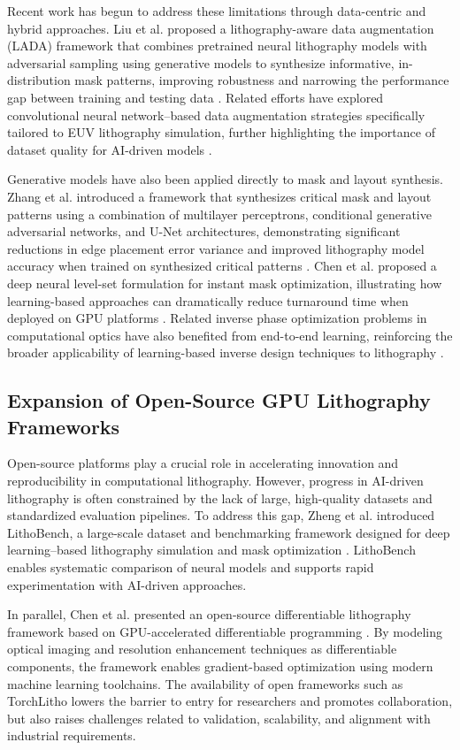 \documentclass[pdflatex,sn-mathphys-num]{sn-jnl}%
\theoremstyle{thmstyleone}%
\theoremstyle{thmstyletwo}%
\theoremstyle{thmstylethree}%
\begin{document}
Recent work has begun to address these limitations through data-centric and hybrid approaches. Liu et al. proposed a lithography-aware data augmentation (LADA) framework that combines pretrained neural lithography models with adversarial sampling using generative models to synthesize informative, in-distribution mask patterns, improving robustness and narrowing the performance gap between training and testing data \cite{liu2023adversarial}. Related efforts have explored convolutional neural network–based data augmentation strategies specifically tailored to EUV lithography simulation, further highlighting the importance of dataset quality for AI-driven models \cite{Tanabe2022}.

Generative models have also been applied directly to mask and layout synthesis. Zhang et al. introduced a framework that synthesizes critical mask and layout patterns using a combination of multilayer perceptrons, conditional generative adversarial networks, and U-Net architectures, demonstrating significant reductions in edge placement error variance and improved lithography model accuracy when trained on synthesized critical patterns \cite{zhang2025synthesis}. Chen et al. proposed a deep neural level-set formulation for instant mask optimization, illustrating how learning-based approaches can dramatically reduce turnaround time when deployed on GPU platforms \cite{Chen2023DevelSet}. Related inverse phase optimization problems in computational optics have also benefited from end-to-end learning, reinforcing the broader applicability of learning-based inverse design techniques to lithography \cite{Shi2022Hologram}.

\subsection{Expansion of Open-Source GPU Lithography Frameworks}
Open-source platforms play a crucial role in accelerating innovation and reproducibility in computational lithography. However, progress in AI-driven lithography is often constrained by the lack of large, high-quality datasets and standardized evaluation pipelines. To address this gap, Zheng et al. introduced LithoBench, a large-scale dataset and benchmarking framework designed for deep learning–based lithography simulation and mask optimization \cite{zheng2023lithobench}. LithoBench enables systematic comparison of neural models and supports rapid experimentation with AI-driven approaches.

In parallel, Chen et al. presented an open-source differentiable lithography framework based on GPU-accelerated differentiable programming \cite{chen2024open}. By modeling optical imaging and resolution enhancement techniques as differentiable components, the framework enables gradient-based optimization using modern machine learning toolchains. The availability of open frameworks such as TorchLitho lowers the barrier to entry for researchers and promotes collaboration, but also raises challenges related to validation, scalability, and alignment with industrial requirements.
\end{document}
